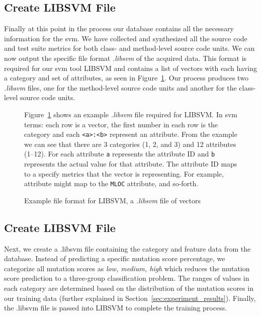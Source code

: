 \subsection{Create LIBSVM File}
\label{subsec:appraoch_create_libsvm_file}
Finally at this point in the process our database contains all the necessary information for the \gls{svm}. We have collected and synthesized all the source code and test suite metrics for both class- and method-level source code units. We can now output the specific file format \emph{.libsvm} of the acquired data. This format is required for our \gls{svm} tool LIBSVM and contains a list of vectors with each having a category and set of attributes, as seen in Figure~\ref{fig:libsvm_file}. Our process produces two \emph{.libsvm} files, one for the method-level source code units and another for the class-level source code units.

\begin{figure}[h]
  \centering
  \begin{minipage}{9.5cm}
    
  \end{minipage}
  \caption{Example file format for LIBSVM, a \emph{.libsvm} file of vectors}
  \vspace{1mm}
  \footnotesize{Figure~\ref{fig:libsvm_file} shows an example \emph{.libsvm} file required for LIBSVM. In \gls{svm} terms: each row is a vector, the first number in each row is the category and each \texttt{<a>:<b>} represent an attribute. From the example we can see that there are 3 categories (1, 2, and 3) and 12 attributes (1--12). For each attribute \texttt{a} represents the attribute ID and \texttt{b} represents the actual value for that attribute. The attribute ID maps to a specify metrics that the vector is representing. For example, attribute  might map to the \texttt{MLOC} attribute, and so-forth.}
  \vspace{1mm}
  \label{fig:libsvm_file}
\end{figure}


\subsection{Create LIBSVM File}
\label{subsec:appraoch_create_libsvm_file}
Next, we create a .libsvm file containing the category and feature data from the database. Instead of predicting a specific mutation score percentage, we categorize all mutation scores as \textit{low, medium, high} which reduces the mutation score prediction to a three-group classification problem. The ranges of values in each category are determined based on the distribution of the mutation scores in our training data (further explained in Section~\ref{sec:experiment_results}). Finally, the .libsvm file is passed into LIBSVM to complete the training process.

